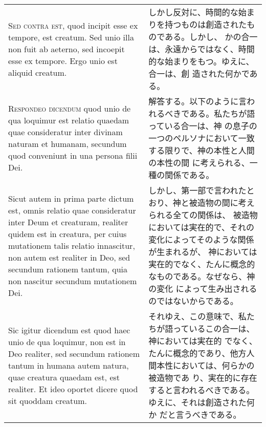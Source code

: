 \documentclass[10pt]{jsarticle} %
\begin{document}
\begin{longtable}{p{21em}p{21em}}
{\scshape Sed contra est}, quod incipit esse ex tempore, est
creatum. Sed unio illa non fuit ab aeterno, sed incoepit esse ex
tempore. Ergo unio est aliquid creatum.


&


しかし反対に、時間的な始まりを持つものは創造されたものである。しかし、
かの合一は、永遠からではなく、時間的な始まりをもつ。ゆえに、合一は、創
造された何かである。

\\



{\scshape Respondeo dicendum} quod unio de qua loquimur est relatio
quaedam quae consideratur inter divinam naturam et humanam, secundum
quod conveniunt in una persona filii Dei.


&

解答する。以下のように言われるべきである。私たちが語っている合一は、神
の息子の一つのペルソナにおいて一致する限りで、神の本性と人間の本性の間
に考えられる、一種の関係である。

\\

Sicut autem in prima parte dictum est, omnis relatio quae consideratur
inter Deum et creaturam, realiter quidem est in creatura, per cuius
mutationem talis relatio innascitur, non autem est realiter in Deo,
sed secundum rationem tantum, quia non nascitur secundum mutationem
Dei.


&

しかし、第一部で言われたとおり、神と被造物の間に考えられる全ての関係は、
被造物においては実在的で、それの変化によってそのような関係が生まれるが、
神においては実在的でなく、たんに概念的なものである。なぜなら、神の変化
によって生み出されるのではないからである。


\\


Sic igitur dicendum est quod haec unio de qua loquimur, non est in Deo
realiter, sed secundum rationem tantum in humana autem natura, quae
creatura quaedam est, est realiter. Et ideo oportet dicere quod sit
quoddam creatum.


&

それゆえ、この意味で、私たちが語っているこの合一は、神においては実在的
でなく、たんに概念的であり、他方人間本性においては、何らかの被造物であ
り、実在的に存在すると言われるべきである。ゆえに、それは創造された何か
だと言うべきである。


\\




\end{longtable}
\end{document}
